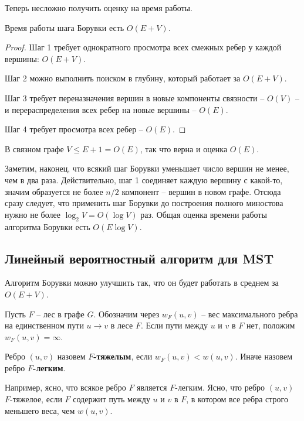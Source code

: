 Теперь несложно получить оценку на время работы.

\begin{lemma*} Время работы шага Борувки есть $O(E+V)$. \end{lemma*}
\begin{proof}

Шаг 1 требует однократного просмотра всех смежных ребер у каждой вершины: $O(E+V)$.

Шаг 2 можно выполнить поиском в глубину, который работает за $O(E+V)$.

Шаг 3 требует переназначения вершин в новые компоненты связности -- $O(V)$ -- и перераспределения всех ребер на новые вершины  -- $O(E)$.

Шаг 4 требует просмотра всех ребер -- $O(E)$.
\end{proof}

В связном графе $V \leq E + 1 = O(E)$, так что верна и оценка $O(E)$.

Заметим, наконец, что всякий шаг Борувки уменьшает число вершин не менее, чем в два раза. Действительно, шаг 1 соединяет каждую вершину с какой-то, значим образуется не более $n/2$ компонент -- вершин в новом графе. Отсюда сразу следует, что применить шаг Борувки до построения полного миностова нужно не более $\log_2 V = O(\log V)$ раз. Общая оценка времени работы алгоритма Борувки есть $O(E\log V)$.

\subsection{Линейный вероятностный алгоритм для MST}

Алгоритм Борувки можно улучшить так, что он будет работать в среднем за $O(E+V)$.

Пусть $F$ -- лес в графе $G$. Обозначим через $w_F(u, v)$ -- вес максимального ребра на единственном пути $u \rightarrow v$ в лесе $F$. Если пути между $u$ и $v$ в $F$ нет, положим $w_F(u,v) = \infty$.

\begin{definition*} Ребро $(u,v)$ назовем \textbf{$F$-тяжелым}, если $w_F(u,v) < w(u,v)$. Иначе назовем ребро \textbf{$F$-легким}.
\end{definition*}

Например, ясно, что всякое ребро $F$ является $F$-легким. Ясно, что ребро $(u,v)$ $F$-тяжелое, если $F$ содержит путь между $u$ и $v$ в $F$, в котором все ребра строго меньшего веса, чем $w(u,v)$.

